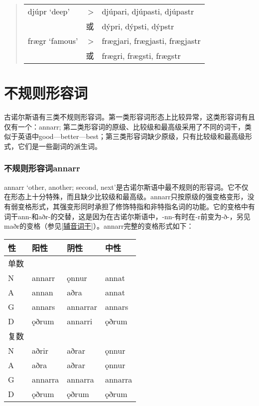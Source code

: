 \begin{quote}
    \begin{tabular}{lrl}
        djúpr ‘deep‌’   & >  & djúpari,	djúpasti,	djúpastr    \\
                       & 或 & dýpri,	dýpsti,	dýpstr          \\
        frægr ‘famous‌’ & >  & frægjari,	frægjasti,	frægjastr \\
                       & 或 & frægri,	frægsti,	frægstr
    \end{tabular}
\end{quote}

\section{不规则形容词}\label{不规则形容词}

古诺尔斯语有三类不规则形容词。第一类形容词形态上比较异常，这类形容词有且仅有一个：annarr; 第二类形容词的原级、比较级和最高级采用了不同的词干，类似于英语中good---better---best；第三类形容词缺少原级，只有比较级和最高级形式，它们是一些副词的派生词。


\subsubsection{不规则形容词annarr}

annarr `other, another; second, next‌'是古诺尔斯语中最不规则的形容词。它不仅在形态上十分特殊，而且缺少比较级和最高级。annarr只按原级的强变格变形，没有弱变格形式，其强变形同时承担了修饰特指和非特指名词的功能。它的变格中有词干ann-和aðr-的交替，这是因为在古诺尔斯语中，-nn-有时在-r前变为-ð-，另见maðr的变格（参见\ref{辅音词干}）。annarr完整的变格形式如下：%

\begin{longtable}{llll}
    \toprule
    性   & 阳性    & 阴性     & 中性    \\
    \midrule
    \endhead
    \bottomrule
    \endfoot
    单数 &         &          &         \\
    N    & annarr  & ǫnnur    & annat   \\
    A    & annan   & aðra     & annat   \\
    G    & annars  & annarrar & annars  \\
    D    & ǫðrum   & annarri  & ǫðrum   \\
    复数 &         &          &         \\
    N    & aðrir   & aðrar    & ǫnnur   \\
    A    & aðra    & aðrar    & ǫnnur   \\
    G    & annarra & annarra  & annarra \\
    D    & ǫðrum   & ǫðrum    & ǫðrum   \\
\end{longtable}


